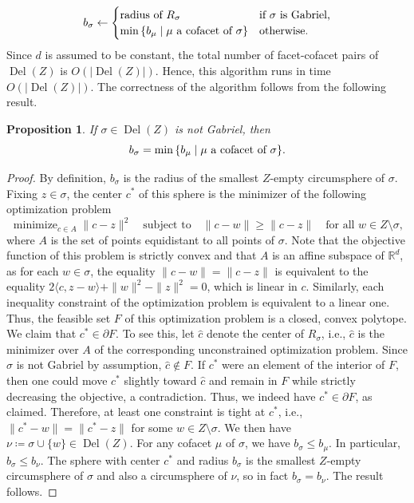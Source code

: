 \documentclass[11pt]{amsart}
\newcommand{\R}{\mathbb{R}} %
\DeclareMathOperator{\DelT}{Del}
\DeclareMathOperator*{\minimize}{minimize}
\theoremstyle{plain}
\newtheorem{proposition}[theorem]{Proposition}
\theoremstyle{definition}
\theoremstyle{remark}
\begin{document}
\[
b_\sigma \leftarrow
\begin{cases}
\textup{radius of } R_{\sigma} & \text{if } \sigma \text{ is Gabriel,} \\
\min\, \{ b_\mu\mid \mu \text{ a cofacet of } \sigma\} & \text{otherwise.}
\end{cases}
\]
Since $d$ is assumed to be constant, the total number of facet-cofacet pairs of $\DelT(Z)$ is $O(|\DelT(Z)|)$.  Hence, this algorithm runs in time $O(|\DelT(Z)|)$.  The correctness of the algorithm follows from the following result.
%
\begin{proposition} \label{Prop:Del_Rad_Coface_Formula}
If $\sigma \in \DelT(Z)$ is not Gabriel, then \[b_\sigma = \min\, \{ b_\mu\mid \mu \textup{ a cofacet of } \sigma\}.\]
\end{proposition}
%
\begin{proof}
By definition, $b_{\sigma}$ is the radius of the smallest $Z$-empty circumsphere of $\sigma$.  Fixing $z\in \sigma$, the center $c^*$ of this sphere is the minimizer of the following optimization problem \[
\minimize_{c \in A} \|c - z\|^2 \quad \text{subject to} \quad \|c - w\| \geq \|c - z\| \quad \text{for all } w \in Z \setminus \sigma,
\] 
where $A$ is the set of points equidistant to all points of $\sigma$.   Note that the objective function of this problem is strictly convex and that $A$ is an affine subspace of $\R^d$, as for each $w\in \sigma$, the equality $\|c - w\| = \|c - z\|$ is equivalent to the equality $2\langle c, z- w \rangle+ \|w\|^2 - \|z\|^2  = 0$, which is linear in $c$.  Similarly, each inequality constraint of the optimization problem is equivalent to a linear one.  Thus, the feasible set $F$ of this optimization problem is a closed, convex polytope.    
%
We claim that $c^*\in \partial F$. To see this, let $\hat c$ denote the center of $R_{\sigma}$, i.e., $\hat c$ is the minimizer over $A$ of the corresponding unconstrained optimization problem.  Since $\sigma$ is not Gabriel by assumption, $\hat c\not \in F$.   If $c^*$ were an element of the interior of $F$, then one could move $c^*$ slightly toward $\hat c$ and remain in $F$ while strictly decreasing the objective, a contradiction.  Thus, we indeed have $c^*\in \partial F$, as claimed.  Therefore, at least one constraint is tight at $c^*$, i.e., $\|c^* - w\| = \|c^* - z\|$ for some $w \in Z \setminus \sigma$.  We then have $\nu\coloneqq \sigma\cup \{w\}\in \DelT(Z)$.
%
For any cofacet $\mu$ of $\sigma$, we have  $b_{\sigma}\leq b_{\mu}$.  In particular, $b_{\sigma}\leq b_{\nu}$.  The sphere with center $c^*$ and radius $b_{\sigma}$ is the smallest $Z$-empty circumsphere of $\sigma$ and also a circumsphere of $\nu$, so in fact $ b_{\sigma}=b_{\nu}$.  The result follows.
\end{proof}
%
%
\end{document}
